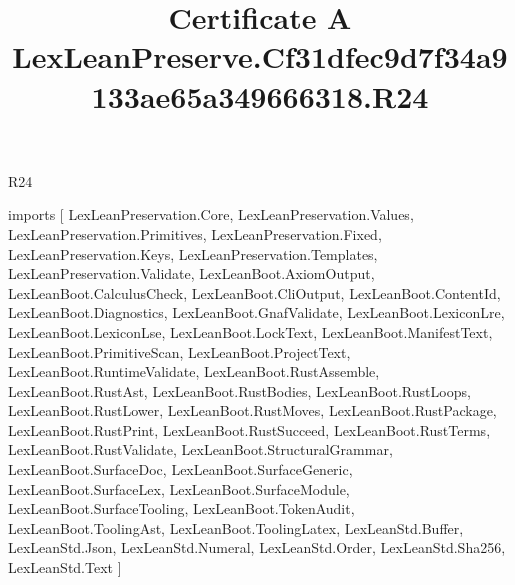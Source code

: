 \begin{lexlean}{R24}
\title{Certificate A LexLeanPreserve.Cf31dfec9d7f34a9133ae65a349666318.R24}
\begin{coremodule}
imports [
  LexLeanPreservation.Core,
  LexLeanPreservation.Values,
  LexLeanPreservation.Primitives,
  LexLeanPreservation.Fixed,
  LexLeanPreservation.Keys,
  LexLeanPreservation.Templates,
  LexLeanPreservation.Validate,
  LexLeanBoot.AxiomOutput,
  LexLeanBoot.CalculusCheck,
  LexLeanBoot.CliOutput,
  LexLeanBoot.ContentId,
  LexLeanBoot.Diagnostics,
  LexLeanBoot.GnafValidate,
  LexLeanBoot.LexiconLre,
  LexLeanBoot.LexiconLse,
  LexLeanBoot.LockText,
  LexLeanBoot.ManifestText,
  LexLeanBoot.PrimitiveScan,
  LexLeanBoot.ProjectText,
  LexLeanBoot.RuntimeValidate,
  LexLeanBoot.RustAssemble,
  LexLeanBoot.RustAst,
  LexLeanBoot.RustBodies,
  LexLeanBoot.RustLoops,
  LexLeanBoot.RustLower,
  LexLeanBoot.RustMoves,
  LexLeanBoot.RustPackage,
  LexLeanBoot.RustPrint,
  LexLeanBoot.RustSucceed,
  LexLeanBoot.RustTerms,
  LexLeanBoot.RustValidate,
  LexLeanBoot.StructuralGrammar,
  LexLeanBoot.SurfaceDoc,
  LexLeanBoot.SurfaceGeneric,
  LexLeanBoot.SurfaceLex,
  LexLeanBoot.SurfaceModule,
  LexLeanBoot.SurfaceTooling,
  LexLeanBoot.TokenAudit,
  LexLeanBoot.ToolingAst,
  LexLeanBoot.ToolingLatex,
  LexLeanStd.Buffer,
  LexLeanStd.Json,
  LexLeanStd.Numeral,
  LexLeanStd.Order,
  LexLeanStd.Sha256,
  LexLeanStd.Text
]


\end{coremodule}
\end{lexlean}

